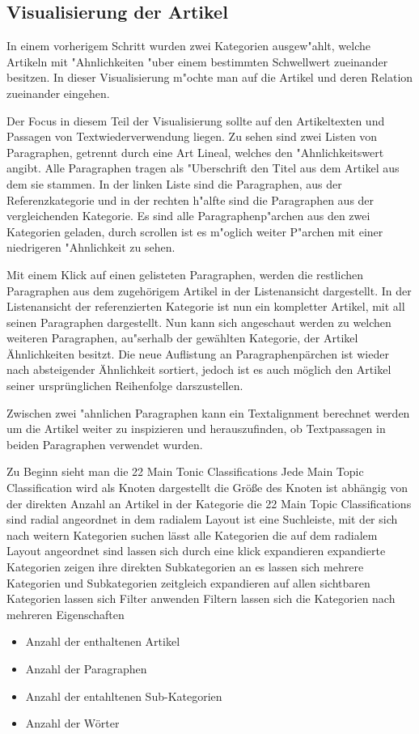 \subsection{Visualisierung der Artikel}
In einem vorherigem Schritt wurden zwei Kategorien ausgew"ahlt, welche Artikeln mit "Ahnlichkeiten "uber einem bestimmten 
Schwellwert zueinander besitzen.
In dieser Visualisierung m"ochte man auf die Artikel und deren Relation zueinander eingehen. 

Der Focus in diesem Teil der Visualisierung sollte auf den Artikeltexten und Passagen von Textwiederverwendung liegen.
Zu sehen sind zwei Listen von Paragraphen, getrennt durch eine Art Lineal, welches den "Ahnlichkeitswert angibt.
Alle Paragraphen tragen als "Uberschrift den Titel aus dem Artikel aus dem sie stammen.
In der linken Liste sind die Paragraphen, aus der Referenzkategorie und in der rechten h"alfte sind die Paragraphen aus der 
vergleichenden Kategorie.
Es sind alle Paragraphenp"archen aus den zwei Kategorien geladen, durch scrollen ist es m"oglich weiter P"archen mit einer niedrigeren 
"Ahnlichkeit zu sehen.

Mit einem Klick auf einen gelisteten Paragraphen, werden die restlichen Paragraphen aus dem zugehörigem Artikel in der Listenansicht dargestellt.
In der Listenansicht der referenzierten Kategorie ist nun ein kompletter Artikel, mit all seinen Paragraphen dargestellt.
Nun kann sich angeschaut werden zu welchen weiteren Paragraphen, au"serhalb der gewählten Kategorie, der Artikel Ähnlichkeiten besitzt.
Die neue Auflistung an Paragraphenpärchen ist wieder nach absteigender Ähnlichkeit sortiert, jedoch ist es auch möglich den Artikel seiner
ursprünglichen Reihenfolge darszustellen.

Zwischen zwei "ahnlichen Paragraphen kann ein Textalignment berechnet werden um die Artikel weiter zu inspizieren und herauszufinden,
ob Textpassagen in beiden Paragraphen verwendet wurden.


Zu Beginn sieht man die 22 Main Tonic Classifications
Jede Main Topic Classification wird als Knoten dargestellt
die Größe des Knoten ist abhängig von der direkten Anzahl an Artikel in der Kategorie
die 22 Main Topic Classifications sind radial angeordnet
in dem radialem Layout ist eine Suchleiste, mit der sich nach weitern Kategorien suchen lässt
alle Kategorien die auf dem radialem Layout angeordnet sind lassen sich durch eine klick expandieren
expandierte Kategorien zeigen ihre direkten Subkategorien an
es lassen sich mehrere Kategorien und Subkategorien zeitgleich expandieren
auf allen sichtbaren Kategorien lassen sich Filter anwenden
Filtern lassen sich die Kategorien nach mehreren Eigenschaften
\begin{itemize}
    \item Anzahl der enthaltenen Artikel 
    \item Anzahl der Paragraphen
    \item Anzahl der entahltenen Sub-Kategorien
    \item Anzahl der Wörter
\end{itemize}


